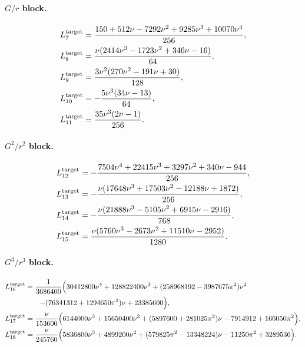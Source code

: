 \documentclass[11pt]{article}
\begin{document}
\paragraph{\texorpdfstring{$G/r$}{G/r} block.}
\begin{align}
L_7^{\rm target}
&=
\frac{150+512\nu-7292\nu^2+9285\nu^3+10070\nu^4}{256},
\label{eq:app-local-target-ordinary-L7}
\\
L_8^{\rm target}
&=
\frac{\nu(2414\nu^3-1723\nu^2+346\nu-16)}{64},
\label{eq:app-local-target-ordinary-L8}
\\
L_9^{\rm target}
&=
\frac{3\nu^2(270\nu^2-191\nu+30)}{128},
\label{eq:app-local-target-ordinary-L9}
\\
L_{10}^{\rm target}
&=
-\frac{5\nu^3(34\nu-13)}{64},
\label{eq:app-local-target-ordinary-L10}
\\
L_{11}^{\rm target}
&=
\frac{35\nu^3(2\nu-1)}{256}.
\label{eq:app-local-target-ordinary-L11}
\end{align}

\paragraph{\texorpdfstring{$G^2/r^2$}{G	extasciicircum2/r	extasciicircum2} block.}
\begin{align}
L_{12}^{\rm target}
&=
-\frac{7504\nu^4+22415\nu^3+3297\nu^2+340\nu-944}{256},
\label{eq:app-local-target-ordinary-L12}
\\
L_{13}^{\rm target}
&=
-\frac{\nu(17648\nu^3+17503\nu^2-12188\nu+1872)}{256},
\label{eq:app-local-target-ordinary-L13}
\\
L_{14}^{\rm target}
&=
-\frac{\nu(21888\nu^3-5105\nu^2+6915\nu-2916)}{768},
\label{eq:app-local-target-ordinary-L14}
\\
L_{15}^{\rm target}
&=
\frac{\nu(5760\nu^3-2673\nu^2+11510\nu-2952)}{1280}.
\label{eq:app-local-target-ordinary-L15}
\end{align}

\paragraph{\texorpdfstring{$G^3/r^3$}{G	extasciicircum3/r	extasciicircum3} block.}
\begin{align}
L_{16}^{\rm target}
&=
\frac{1}{3686400}\Bigl(
30412800\nu^4+128822400\nu^3
+(258968192-3987675\pi^2)\nu^2
\Bigr.
\nonumber\\
&\hspace{2em}\Bigl.
-(76341312+1294650\pi^2)\nu+23385600
\Bigr),
\label{eq:app-local-target-ordinary-L16}
\\
L_{17}^{\rm target}
&=
\frac{\nu}{153600}\Bigl(
6144000\nu^3+15650400\nu^2
+(5897600+281025\pi^2)\nu
-7914912+166050\pi^2
\Bigr),
\label{eq:app-local-target-ordinary-L17}
\\
L_{18}^{\rm target}
&=
\frac{\nu}{245760}\Bigl(
5836800\nu^3+4899200\nu^2
+(579825\pi^2-13348224)\nu
-11250\pi^2+3289536
\Bigr).
\label{eq:app-local-target-ordinary-L18}
\end{align}
\end{document}
